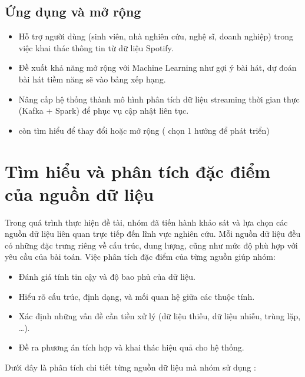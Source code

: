 \documentclass{../hcmut-report}
\begin{document}
\subsection{Ứng dụng và mở rộng}
\begin{itemize}
    \item Hỗ trợ người dùng (sinh viên, nhà nghiên cứu, nghệ sĩ, doanh nghiệp) trong việc khai thác thông tin từ dữ liệu Spotify.
    \item Đề xuất khả năng mở rộng với Machine Learning như gợi ý bài hát, dự đoán bài hát tiềm năng sẽ vào bảng xếp hạng.
    \item Nâng cấp hệ thống thành mô hình phân tích dữ liệu streaming thời gian thực (Kafka + Spark) để phục vụ cập nhật liên tục.
    \item còn tìm hiểu để thay đổi hoặc mở rộng ( chọn 1 hướng để phát triển)
\end{itemize}






\section{Tìm hiểu và phân tích đặc điểm của nguồn dữ liệu}
Trong quá trình thực hiện đề tài, nhóm đã tiến hành khảo sát và lựa chọn các nguồn dữ liệu 
liên quan trực tiếp đến lĩnh vực nghiên cứu. 
Mỗi nguồn dữ liệu đều có những đặc trưng riêng về cấu trúc, dung lượng, cũng như mức độ phù hợp 
với yêu cầu của bài toán. 
Việc phân tích đặc điểm của từng nguồn giúp nhóm:
\begin{itemize}
    \item Đánh giá tính tin cậy và độ bao phủ của dữ liệu.
    \item Hiểu rõ cấu trúc, định dạng, và mối quan hệ giữa các thuộc tính.
    \item Xác định những vấn đề cần tiền xử lý (dữ liệu thiếu, dữ liệu nhiễu, trùng lặp, …).
    \item Đề ra phương án tích hợp và khai thác hiệu quả cho hệ thống.
\end{itemize}

\large{Dưới đây là phân tích chi tiết từng nguồn dữ liệu mà nhóm sử dụng :}

% 
\end{document}

